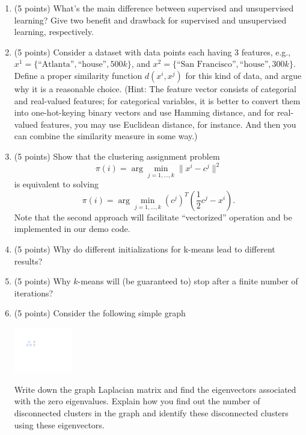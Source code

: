 \documentclass[twoside,10pt]{article}
\begin{document}
\begin{enumerate}

\item (5 points) What's the main difference between supervised and unsupervised learning? Give two benefit and drawback for supervised and unsupervised learning, respectively. 

\item (5 points) Consider a dataset with data points each having 3 features, e.g., $x^1 = \{\mbox{``Atlanta''}, \mbox{``house''}, 500k\}$, and $x^2 = \{\mbox{``San Francisco''}, \mbox{``house''}, 300k\}$. Define a proper similarity function $d(x^i, x^j)$ for this kind of data, and argue why it is a reasonable choice. (Hint: The feature vector consists of categorial and real-valued features; for categorical variables, it is better to convert them into one-hot-keying binary vectors and use Hamming distance, and for real-valued features, you may use Euclidean distance, for instance. And then you can combine the similarity measure in some way.)

\item (5 points) Show that the clustering assignment problem 
\[
\pi(i) = \arg\min_{j=1, \ldots, k} \|x^i- c^j\|^2
\]
is equivalent to solving
\[
\pi(i) = \arg \min_{j=1, \ldots, k} (c^j)^T\left(\frac 1 2 c^j-x^i\right).
\]
Note that the second approach will facilitate ``vectorized'' operation and be implemented in our demo code. 



\item (5 points) Why do different initializations for k-means lead to different results?

\item (5 points) Why $k$-means will (be guaranteed to) stop after a finite number of iterations?

\item (5 points) Consider the following simple graph
\begin{center}
\includegraphics[width = 0.2\textwidth]{plot}
\end{center}

Write down the graph Laplacian matrix and find the eigenvectors associated with the zero eigenvalues. Explain how you find out the number of disconnected clusters in the graph and identify these disconnected clusters using these eigenvectors.

\end{enumerate}
\end{document}
